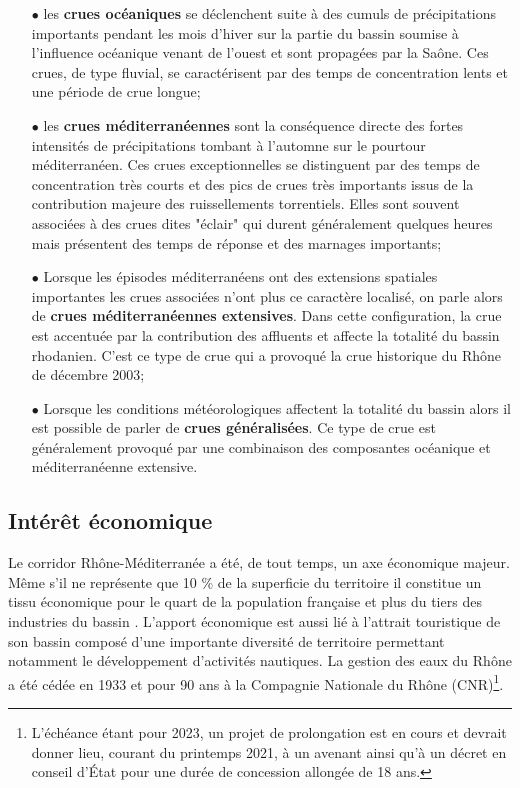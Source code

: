 \begin{itemize}
\item[$\bullet$] les \textbf{crues océaniques} se déclenchent suite à des cumuls de précipitations importants pendant les mois d'hiver sur la partie du bassin soumise à l'influence océanique venant de l'ouest et sont propagées par la Saône. Ces crues, de type fluvial, se caractérisent par des temps de concentration lents et une période de crue longue;\\

\item[$\bullet$] les \textbf{crues méditerranéennes} sont la conséquence directe des fortes intensités de précipitations tombant à l'automne sur le pourtour méditerranéen. Ces crues exceptionnelles se distinguent par des temps de concentration très courts et des pics de crues très importants issus de la contribution majeure des ruissellements torrentiels. Elles sont souvent associées à des crues dites "éclair" qui durent généralement quelques heures mais présentent des temps de réponse et des marnages importants;\\

\item[$\bullet$] Lorsque les épisodes méditerranéens ont des extensions spatiales importantes les crues associées n'ont plus ce caractère localisé, on parle alors de \textbf{crues méditerranéennes extensives}. Dans cette configuration, la crue est accentuée par la contribution des affluents et affecte la totalité du bassin rhodanien. C'est ce type de crue qui a provoqué la crue historique du Rhône de décembre 2003;\\

\item[$\bullet$] Lorsque les conditions météorologiques affectent la totalité du bassin alors il est possible de parler de \textbf{crues généralisées}. Ce type de crue est généralement provoqué par une combinaison des composantes océanique et méditerranéenne extensive.
\end{itemize} 
\clearpage
\subsection*{Intérêt économique}
Le corridor Rhône-Méditerranée a été, de tout temps, un axe économique majeur. Même s'il ne représente que 10 \% de la superficie du territoire il constitue un tissu économique pour le quart de la population française et plus du tiers des industries du bassin \citep{edl2019}. L'apport économique est aussi lié à l'attrait touristique de son bassin composé d'une importante diversité de territoire permettant notamment le développement d'activités nautiques. La gestion des eaux du Rhône a été cédée en 1933 et pour 90 ans à la Compagnie Nationale du Rhône (CNR)\footnote{L'échéance étant pour 2023, un projet de prolongation est en cours et devrait donner lieu, courant du printemps 2021, à un avenant ainsi qu'à un décret en conseil d'État pour une durée de concession allongée de 18 ans.}.\\

